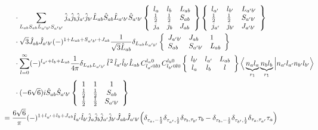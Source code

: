 \documentclass[master]{shnuthesis}
\newcommand{\ap}{a^\prime}
\newcommand{\bp}{b^\prime}
\newcommand{\il}{\!\!\!\!\!\!\!\!\!\!}
\begin{document}
\begin{align}
    & \cdot \sum_{L_{ab}S_{ab}L_{\ap\bp}S_{\ap\bp}} \hat{j}_a\hat{j}_b\hat{j}_{\ap}\hat{j}_{\bp}\hat{L}_{ab}\hat{S}_{ab}\hat{L}_{\ap\bp}\hat{S}_{\ap\bp}  \left\{\begin{array}{lll}l_{a} & l_{b} & L_{ab} \\ \frac{1}{2} & \frac{1}{2} & S_{ab} \\j_{a} & j_{b} & J_{ab} \end{array}\right\}  \left\{\begin{array}{lll}l_{\ap} & l_{\bp} & L_{\ap\bp} \\ \frac{1}{2} & \frac{1}{2} & S_{\ap\bp} \\j_{\ap} & j_{\bp} & J_{\ap\bp} \end{array}\right\}  \notag \\
    & \cdot \sqrt{3}\hat{J}_{ab}\hat{J}_{\ap\bp}(-)^{1+L_{ab}+S_{\ap\bp}+J_{ab}}\frac{1}{\sqrt{3}\hat{L}_{ab}}\delta_{L_{ab}L_{\ap\bp}}  \left\{\begin{array}{lll} J_{\ap\bp} & J_{ab} & 1 \\ S_{ab} & S_{\ap\bp} & L_{ab} \end{array}\right\}  \notag\\
    & \cdot \sum_{l=0}^\infty (-)^{l_{\ap}+l_b+L_{ab}}\frac{1}{4\pi}\delta_{L_{ab}L_{\ap\bp}}\,\hat{l}^{\,2}\,\hat{l}_{\ap}\hat{l}_{\bp}\hat{L}_{ab}\,C_{l_{\ap} 0 l 0}^{l_a 0} \,C_{l_{\bp} 0 l 0}^{l_b 0}  \left\{\begin{array}{ccc} l_{\bp} & l_{\ap} & L_{ab} \\ l_a & l_b & l \end{array}\right\}  \Big\langle \underbrace{n_a l_a}_{r_1} \underbrace{n_b l_b}_{r_1} \Big| n_{\ap} l_{\ap} n_{\bp} l_{\bp} \Big\rangle \notag\\
    & \cdot (-6\sqrt{6})i \hat{S}_{ab}\hat{S}_{\ap\bp}  \left\{\begin{array}{ccc} 1 & 1 & 1 \\ \frac{1}{2} & \frac{1}{2} & S_{ab} \\ \frac{1}{2} & \frac{1}{2} & S_{\ap\bp} \end{array}\right\} \\
    &\il = \frac{6\sqrt{6}}{\pi} (-)^{1+l_{\ap}+l_b+J_{ab}} \hat{l}_{\ap}\hat{l}_{\bp}\hat{j}_a\hat{j}_b\hat{j}_{\ap}\hat{j}_{\bp}\hat{J}_{ab}\hat{J}_{\ap\bp} \Big( \delta_{\tau_a,-\frac{1}{2}}\delta_{\tau_{\ap},\frac{1}{2}}\delta_{\tau_b,\tau_{\bp}}\tau_b - \delta_{\tau_b,-\frac{1}{2}}\delta_{\tau_{\bp},\frac{1}{2}}\delta_{\tau_a,\tau_{\ap}}\tau_a \Big) \notag\\

\end{align}
\end{document}
